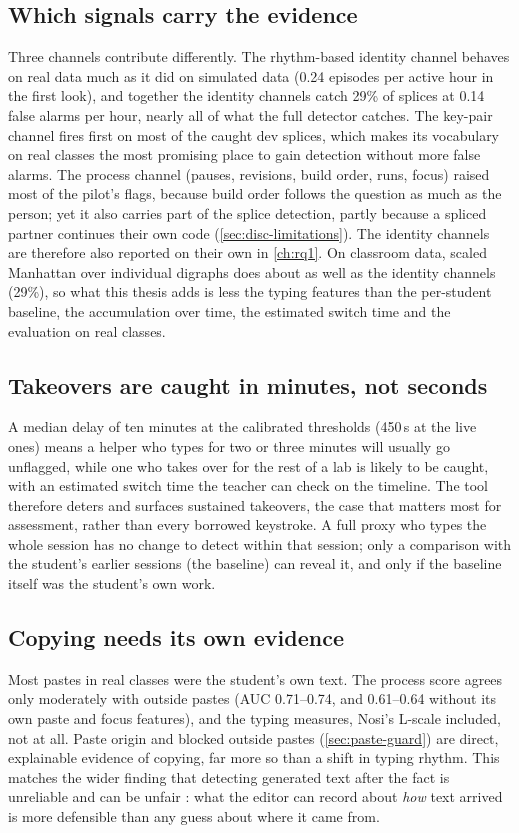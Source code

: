 \subsection{Which signals carry the evidence}
Three channels contribute differently. The rhythm-based identity channel behaves
on real data much as it did on simulated data (0.24 episodes per active hour in
the first look), and together the identity channels catch 29\% of splices at
0.14 false alarms per hour, nearly all of what the full detector catches. The key-pair channel fires first on most of the caught dev
splices, which makes its vocabulary on real classes the most promising place to
gain detection without more false alarms. The process channel (pauses,
revisions, build order, runs, focus) raised most of the pilot's flags, because
build order follows the question as much as the person; yet it also carries part
of the splice detection, partly because a spliced partner continues their own
code (\cref{sec:disc-limitations}). The identity channels are therefore also
reported on their own in \cref{ch:rq1}. On classroom data, scaled Manhattan
over individual digraphs does about as well as the identity channels (29\%), so
what this thesis adds is less the typing features than the per-student
baseline, the accumulation over time, the estimated switch time and the
evaluation on real classes.

\subsection{Takeovers are caught in minutes, not seconds}
A median delay of ten minutes at the calibrated thresholds (450\,s at the
live ones) means a helper who types for
two or three minutes will usually go unflagged, while one who takes over for the
rest of a lab is likely to be caught, with an estimated switch time the teacher
can check on the timeline. The tool therefore deters and surfaces sustained
takeovers, the case that matters most for assessment, rather than every
borrowed keystroke. A full proxy who types the whole session has no change to
detect within that session; only a comparison with the student's earlier
sessions (the baseline) can reveal it, and only if the baseline itself was the
student's own work.

\subsection{Copying needs its own evidence}
Most pastes in real classes were the student's own text. The process score
agrees only moderately with outside pastes (AUC 0.71--0.74, and 0.61--0.64
without its own paste and focus features), and the typing measures, Nosi's
L-scale included, not at all. Paste origin and blocked outside pastes
(\cref{sec:paste-guard}) are direct, explainable evidence of copying, far more
so than a shift in typing rhythm. This matches the wider finding that detecting
generated text after the fact is unreliable and can be unfair
\cite{weberwulff2023testing,liang2023gptdetectors}: what the editor can record
about \emph{how} text arrived is more defensible than any guess about where it
came from.

